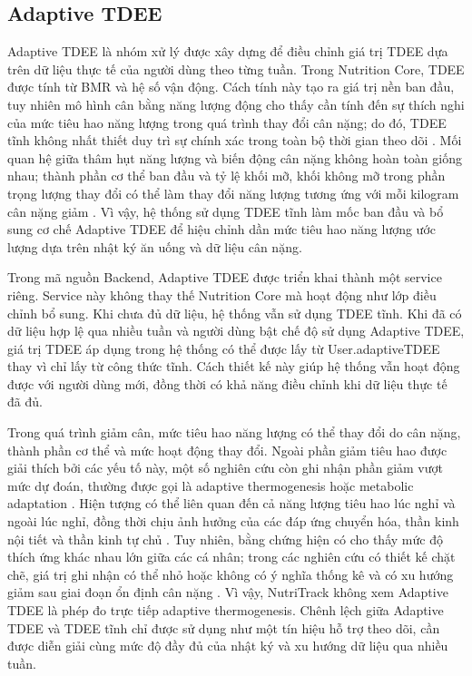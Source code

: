 \documentclass[12pt, a4paper]{report}
\begin{document}
\subsection{Adaptive TDEE}
\label{sec:adaptive-tdee}
Adaptive TDEE là nhóm xử lý được xây dựng để điều chỉnh giá trị TDEE dựa trên dữ liệu thực tế của người dùng theo từng tuần. Trong Nutrition Core, TDEE được tính từ BMR và hệ số vận động. Cách tính này tạo ra giá trị nền ban đầu, tuy nhiên mô hình cân bằng năng lượng động cho thấy cần tính đến sự thích nghi của mức tiêu hao năng lượng trong quá trình thay đổi cân nặng; do đó, TDEE tĩnh không nhất thiết duy trì sự chính xác trong toàn bộ thời gian theo dõi \cite{hall2011_lancet}. Mối quan hệ giữa thâm hụt năng lượng và biến động cân nặng không hoàn toàn giống nhau; thành phần cơ thể ban đầu và tỷ lệ khối mỡ, khối không mỡ trong phần trọng lượng thay đổi có thể làm thay đổi năng lượng tương ứng với mỗi kilogram cân nặng giảm \cite{chow_hall_2008}. Vì vậy, hệ thống sử dụng TDEE tĩnh làm mốc ban đầu và bổ sung cơ chế Adaptive TDEE để hiệu chỉnh dần mức tiêu hao năng lượng ước lượng dựa trên nhật ký ăn uống và dữ liệu cân nặng.

Trong mã nguồn Backend, Adaptive TDEE được triển khai thành một service riêng. Service này không thay thế Nutrition Core mà hoạt động như lớp điều chỉnh bổ sung. Khi chưa đủ dữ liệu, hệ thống vẫn sử dụng TDEE tĩnh. Khi đã có dữ liệu hợp lệ qua nhiều tuần và người dùng bật chế độ sử dụng Adaptive TDEE, giá trị TDEE áp dụng trong hệ thống có thể được lấy từ User.adaptiveTDEE thay vì chỉ lấy từ công thức tĩnh. Cách thiết kế này giúp hệ thống vẫn hoạt động được với người dùng mới, đồng thời có khả năng điều chỉnh khi dữ liệu thực tế đã đủ.

Trong quá trình giảm cân, mức tiêu hao năng lượng có thể thay đổi do cân nặng, thành phần cơ thể và mức hoạt động thay đổi. Ngoài phần giảm tiêu hao được giải thích bởi các yếu tố này, một số nghiên cứu còn ghi nhận phần giảm vượt mức dự đoán, thường được gọi là adaptive thermogenesis hoặc metabolic adaptation \cite{muller2013, rosenbaum2010}. Hiện tượng có thể liên quan đến cả năng lượng tiêu hao lúc nghỉ và ngoài lúc nghỉ, đồng thời chịu ảnh hưởng của các đáp ứng chuyển hóa, thần kinh nội tiết và thần kinh tự chủ \cite{muller2013, rosenbaum2010}. Tuy nhiên, bằng chứng hiện có cho thấy mức độ thích ứng khác nhau lớn giữa các cá nhân; trong các nghiên cứu có thiết kế chặt chẽ, giá trị ghi nhận có thể nhỏ hoặc không có ý nghĩa thống kê và có xu hướng giảm sau giai đoạn ổn định cân nặng \cite{nunes2022}. Vì vậy, NutriTrack không xem Adaptive TDEE là phép đo trực tiếp adaptive thermogenesis. Chênh lệch giữa Adaptive TDEE và TDEE tĩnh chỉ được sử dụng như một tín hiệu hỗ trợ theo dõi, cần được diễn giải cùng mức độ đầy đủ của nhật ký và xu hướng dữ liệu qua nhiều tuần.
\end{document}
